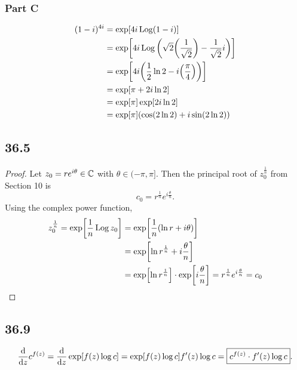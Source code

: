 \documentclass[12pt,titlepage]{extarticle}
\begin{document}
\subsubsection*{Part C}
\begin{align*}
    (1-i)^{4i} &= \exp[4i \operatorname{Log}(1 - i)] \\
               &= \exp[4i \operatorname{Log}\qty(\sqrt{2} \qty(\frac{1}{\sqrt{2}}) - \frac{1}{\sqrt{2}} i)]\\
               &= \exp[4i \qty(\frac{1}{2} \ln 2 - i\qty(\frac{\pi}{4}))] \\
               &= \exp[\pi + 2 i \ln 2] \\
               &= \exp[\pi] \exp[2 i \ln 2] \\
               &= \exp[\pi] \qty(\cos(2 \ln 2) + i \sin(2 \ln 2))
\end{align*}

\subsection*{36.5}
\begin{proof}
    Let $z_0 = r e^{i \theta} \in \mathbb{C}$ with $\theta \in (-\pi, \pi]$. Then the principal root of $z_0^{\frac{1}{n}}$ from Section 10 is
    \[
        c_0 = r^{\frac{1}{n}} e^{i\frac{\theta}{n}}
    .\]
    Using the complex power function,
    \begin{align*}
        z_0^{\frac{1}{n}} = \exp[\frac{1}{n} \operatorname{Log} z_0] &= \exp[\frac{1}{n} (\ln r + i \theta)] \\
        &= \exp[\ln r^{\frac{1}{n}} + i \frac{\theta}{n}] \\
        &= \exp[\ln r^{\frac{1}{n}}] \cdot \exp[i \frac{\theta}{n}] = r^{\frac{1}{n}} e^{i \frac{\theta}{n}} = c_0 \qedhere
    \end{align*}
\end{proof}

\subsection*{36.9}
\[
    \dv{z} c^{f(z)} = \dv{z} \exp[f(z) \log c] = \exp[f(z) \log c] f'(z) \log c = \boxed{c^{f(z)} \cdot f'(z) \log c}
.\]
\end{document}
